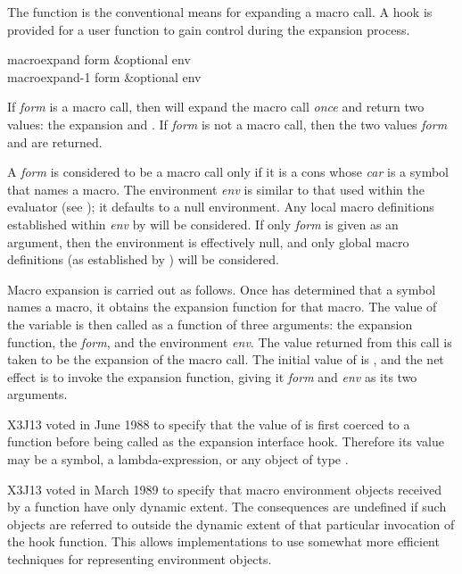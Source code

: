 The  function is the conventional means for
expanding a macro call.  A hook is provided for a user function
to gain control during the expansion process.

\begin{defun}[Function]
macroexpand form &optional env \\
macroexpand-1 form &optional env

If {\it form} is a macro call, then  will expand the macro
call {\it once} and return two values: the expansion and .
If {\it form} is not a macro call, then the two values {\it form} and {\nil} are
returned.

A {\it form} is considered to be a macro call only if it is a cons whose
{\it car} is a symbol that names a macro.  The environment {\it env} is similar
to that used within the evaluator (see );
it defaults to a null environment.
Any local macro definitions established within {\it env} by
 will be considered.  If only {\it form} is given as an
argument, then the environment is effectively null,
and only global macro definitions
(as established by ) will be considered.

Macro expansion is carried out as follows.  Once  has
determined that a symbol names a macro, it obtains the expansion
function for that macro.  The value of the variable
 is then called as a function of three arguments:
the expansion function, the {\it form}, and the environment {\it env}.
The value returned from
this call is taken to be the expansion of the macro call.
The initial value of  is ,
and the net effect is to invoke the expansion function, giving
it {\it form} and {\it env} as its two arguments.

\begin{newer}
X3J13 voted in June 1988  to specify
that the value of  is first coerced to a
function before being called as the expansion interface hook.
Therefore its value may be a symbol, a lambda-expression, or any
object of type .
\end{newer}

\begin{newer}
X3J13 voted in March 1989 
to specify that macro environment objects received
by a  function
have only dynamic extent.  The consequences are undefined if such objects are
referred to outside the dynamic extent of that particular invocation of the hook
function.  This allows implementations to use somewhat more efficient techniques
for representing environment objects. 
\end{newer}


\end{defun}
